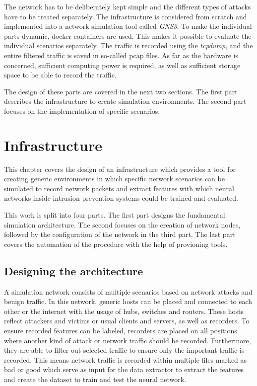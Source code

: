 \documentclass[conference]{IEEEtran}
\begin{document}
The network has to be deliberately kept simple and the different types of attacks have to be treated separately. The infrastructure is considered from scratch and implemented into a network simulation tool called \textit{GNS3}. To make the individual parts dynamic, docker containers are used. This makes it possible to evaluate the individual scenarios separately. The traffic is recorded using the \textit{tcpdump}, and the entire filtered traffic is saved in so-called pcap files. As far as the hardware is concerned, sufficient computing power is required, as well as sufficient storage space to be able to record the traffic. 

The design of these parts are covered in the next two sections. The first part describes the infrastructure to create simulation environments. The second part focuses on the implementation of specific scenarios.

\section{Infrastructure}
This chapter covers the design of an infrastructure which provides a tool for creating generic environments in which specific network scenarios can be simulated to record network packets and extract features with which neural networks inside intrusion prevention systems could be trained and evaluated.

This work is split into four parts. The first part designs the fundamental simulation architecture. The second focuses on the creation of network nodes, followed by the configuration of the network in the third part. The last part covers the automation of the procedure with the help of provioning tools.

\subsection{Designing the architecture}
A simulation network consists of multiple scenarios based on network attacks and benign traffic. In this network, generic hosts can be placed and connected to each other or the internet with the usage of hubs, switches and routers. These hosts reflect attackers and victims or usual clients and servers, as well as recorders. To ensure recorded features can be labeled, recorders are placed on all positions where another kind of attack or network traffic should be recorded. Furthermore, they are able to filter out selected traffic to ensure only the important traffic is recorded. This means network traffic is recorded within multiple files marked as bad or good which serve as input for the data extractor to extract the features and create the dataset to train and test the neural network.
\end{document}
